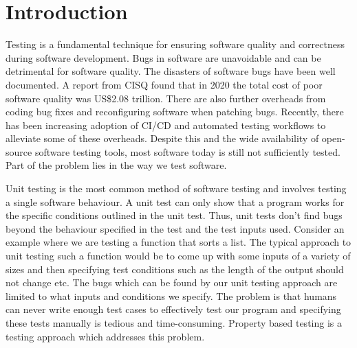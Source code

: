 \chapter{Introduction}
\label{cha:intro}
Testing is a fundamental technique for ensuring software quality and correctness during software development. Bugs in software are unavoidable and can be detrimental for software quality. The disasters of software bugs have been well documented. A report from CISQ found that in 2020 the total cost of poor software quality was US\$2.08 trillion. There are also further overheads from coding bug fixes and reconfiguring software when patching bugs. Recently, there has been increasing adoption of CI/CD and automated testing workflows to alleviate some of these overheads. Despite this and the wide availability of open-source software testing tools, most software today is still not sufficiently tested. Part of the problem lies in the way we test software. 

Unit testing is the most common method of software testing and involves testing a single software behaviour. A unit test can only show that a program works for the specific conditions outlined in the unit test. Thus, unit tests don’t find bugs beyond the behaviour specified in the test and the test inputs used. Consider an example where we are testing a function that sorts a list. The typical approach to unit testing such a function would be to come up with some inputs of a variety of sizes and then specifying test conditions such as the length of the output should not change etc. The bugs which can be found by our unit testing approach are limited to what inputs and conditions we specify. The problem is that humans can never write enough test cases to effectively test our program and specifying these tests manually is tedious and time-consuming. Property based testing is a testing approach which addresses this problem.

